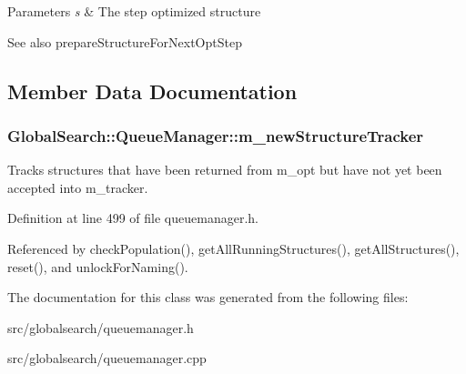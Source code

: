 \begin{DoxyParams}{Parameters}
{\em s} & The step optimized structure \\
\hline
\end{DoxyParams}
\begin{DoxySeeAlso}{See also}
prepare\+Structure\+For\+Next\+Opt\+Step 
\end{DoxySeeAlso}


\subsection{Member Data Documentation}
\hypertarget{classGlobalSearch_1_1QueueManager_ab93522c4a198ea3401baf662b00a7ec7}{}
\subsubsection[{m\+\_\+new\+Structure\+Tracker}]{ Global\+Search\+::\+Queue\+Manager\+::m\+\_\+new\+Structure\+Tracker\hspace{0.3cm}{\ttfamily [protected]}}\label{classGlobalSearch_1_1QueueManager_ab93522c4a198ea3401baf662b00a7ec7}
Tracks structures that have been returned from m\+\_\+opt but have not yet been accepted into m\+\_\+tracker. 

Definition at line 499 of file queuemanager.\+h.



Referenced by check\+Population(), get\+All\+Running\+Structures(), get\+All\+Structures(), reset(), and unlock\+For\+Naming().



The documentation for this class was generated from the following files\+:\begin{DoxyCompactItemize}
\item 
src/globalsearch/queuemanager.\+h\item 
src/globalsearch/queuemanager.\+cpp\end{DoxyCompactItemize}

